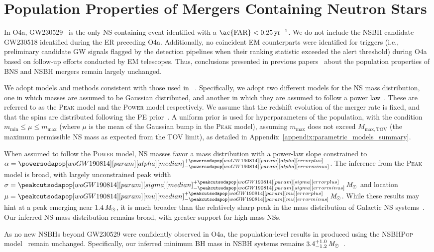 \section{Population Properties of Mergers Containing Neutron Stars}\label{sec:ns}

In O4a, GW230529~\citep{LIGOScientific:2024elc} is the only \ac{NS}-containing event identified with a ${\rm \ac{FAR} < 0.25\,{yr}^{-1}}$. We do not include the \ac{NSBH} candidate GW230518 identified during the \ac{ER} preceding \ac{O4a}. Additionally, no coincident \ac{EM} counterparts were identified for triggers (i.e., preliminary candidate GW signals flagged by the detection pipelines when their ranking statistic exceeded the alert threshold) during O4a based on follow-up efforts conducted by \ac{EM} telescopes. Thus, conclusions presented in previous papers~\citep{KAGRA:2021duu, LIGOScientific:2024elc} about the population properties of \ac{BNS} and \ac{NSBH} mergers remain largely unchanged.

We adopt models and methods consistent with those used in \gwtcthree~\citep{KAGRA:2021duu}. Specifically, we adopt two different models for the \ac{NS} mass distribution, one in which masses are assumed to be Gaussian distributed, and another in which they are assumed to follow a power law~\citep{KAGRA:2021duu}. These are referred to as the \textsc{Peak} model and the \textsc{Power} model respectively. We assume that the redshift evolution of the merger rate is fixed, and that the spins are distributed following the \ac{PE} prior~\citep{GWTC:Methods}. A uniform prior is used for hyperparameters of the population, with the condition \(m_\mathrm{min}\leq \mu \leq m_\mathrm{max}\) (where \(\mu\) is the mean of the Gaussian bump in the \textsc{Peak} model), assuming \(m_\mathrm{max}\) does not exceed \(M_\mathrm{max,TOV}\) (the maximum permissible \ac{NS} mass as expected from the TOV limit), as detailed in Appendix~\ref{appendix:parametric_models_summary}. 

When assumed to follow the \textsc{Power} model, \ac{NS} masses favor a mass distribution with a power-law slope constrained to $\alpha=\CIPlusMinus{\powersodapop[woGW190814][param][alpha]}$. The inference from the \textsc{Peak} model is broad, with largely unconstrained peak width $\sigma=\CIPlusMinus{\peakcutsodapop[woGW190814][param][sigma]}\,\Msun$ and location $\mu=\CIPlusMinus{\peakcutsodapop[woGW190814][param][mu]}\,\Msun$. While these results may hint at a peak emerging near \(1.4\,\mathit{M_\odot}\), it is much broader than the relatively sharp peak in the mass distribution of Galactic \ac{NS} systems~\citep{Farrow:2019xnc,2024OJAp....7E..58E}. Our inferred \ac{NS} mass distribution remains broad, with greater support for high-mass \acp{NS}.

As no new \acp{NSBH} beyond GW230529 were confidently observed in O4a, the population-level results in \citet{LIGOScientific:2024elc} produced using the \textsc{NSBHPop} model~\citep{Biscoveanu:2022iue} remain unchanged. Specifically, our inferred minimum \ac{BH} mass in \ac{NSBH} systems remains {$3.4^{+1.0}_{-1.2}\,\mathit{M_\odot}$}~\citep{LIGOScientific:2024elc}. 


